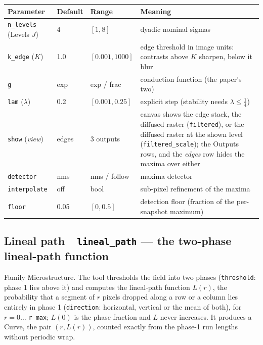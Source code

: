 \documentclass[10pt]{article}
\newcommand{\dev}[1]{\texttt{#1}}
\newcommand{\tool}[2]{#1~\textperiodcentered~\dev{#2}}
\begin{document}
\begin{longtable}{L l l M}
\toprule Parameter & Default & Range & Meaning \\ \midrule
\texttt{n\_levels} (Levels $J$) & 4 & $[1,8]$ & dyadic nominal sigmas \\
\texttt{k\_edge} ($K$) & 1.0 & $[0.001,1000]$ & edge threshold in image units: contrasts above $K$ sharpen, below it blur \\
\texttt{g} & exp & exp / frac & conduction function (the paper's two) \\
\texttt{lam} ($\lambda$) & 0.2 & $[0.001,0.25]$ & explicit step (stability needs $\lambda\le\tfrac14$) \\
\texttt{show} (\emph{view}) & edges & 3 outputs & canvas shows the edge stack, the diffused raster (\texttt{filtered}), or the diffused raster at the shown level (\texttt{filtered\_scale}); the Outputs rows, and the \emph{edges} row hides the maxima over either \\
\texttt{detector} & nms & nms / follow & maxima detector \\
\texttt{interpolate} & off & bool & sub-pixel refinement of the maxima \\
\texttt{floor} & 0.05 & $[0,0.5]$ & detection floor (fraction of the per-snapshot maximum) \\
\bottomrule
\end{longtable}

\subsection{\tool{Lineal path}{lineal\_path} --- the two-phase lineal-path function}\label{sec:lineal}
Family Microstructure. The tool thresholds the field into two phases
(\texttt{threshold}: phase 1 lies above it) and computes the lineal-path function $L(r)$, the
probability that a segment of $r$ pixels dropped along a row or a column lies entirely in phase 1
(\texttt{direction}: horizontal, vertical or the mean of both), for $r = 0 \ldots$ \texttt{r\_max};
$L(0)$ is the phase fraction and $L$ never increases. It produces a Curve, the pair $(r, L(r))$,
counted exactly from the phase-1 run lengths without periodic wrap.
\end{document}
